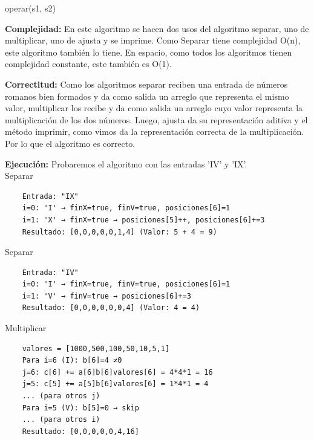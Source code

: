 \documentclass[12pt]{article}
\begin{document}
\begin{itemize}
\begin{enumerate}
        \end{enumerate}
            \begin{algorithm}[H]
        \caption{operar(s1, s2)}
        \SetAlgoLined
        \end{algorithm}
        \textbf{Complejidad:} En este algoritmo se hacen dos usos del algoritmo separar, uno de multiplicar, uno de ajusta y se imprime. Como Separar tiene complejidad O(n), este algoritmo también lo tiene.
        En espacio, como todos los algoritmos tienen complejidad constante, este también es O(1).

        \textbf{Correctitud:} Como los algoritmos separar reciben una entrada de números romanos bien formados y da como salida un arreglo que representa el mismo valor, multiplicar los recibe y da como salida un arreglo cuyo valor representa la multiplicación de los dos números. Luego, ajusta da su representación aditiva y el método imprimir, como vimos da la representación correcta de la multiplicación. Por lo que el algoritmo es correcto.

        \textbf{Ejecución:} Probaremos el algoritmo con las entradas 'IV' y 'IX'.\\
    Separar\\
    \begin{verbatim}
    Entrada: "IX"
    i=0: 'I' → finX=true, finV=true, posiciones[6]=1
    i=1: 'X' → finX=true → posiciones[5]++, posiciones[6]+=3
    Resultado: [0,0,0,0,0,1,4] (Valor: 5 + 4 = 9)
    \end{verbatim}

    Separar\\
    \begin{verbatim}
    Entrada: "IV"
    i=0: 'I' → finX=true, finV=true, posiciones[6]=1
    i=1: 'V' → finV=true → posiciones[6]+=3
    Resultado: [0,0,0,0,0,0,4] (Valor: 4 = 4)
    \end{verbatim}

    Multiplicar\\
    \begin{verbatim}
    valores = [1000,500,100,50,10,5,1]
    Para i=6 (I): b[6]=4 ≠0
    j=6: c[6] += a[6]b[6]valores[6] = 4*4*1 = 16
    j=5: c[5] += a[5]b[6]valores[6] = 1*4*1 = 4
    ... (para otros j)
    Para i=5 (V): b[5]=0 → skip
    ... (para otros i)
    Resultado: [0,0,0,0,0,4,16]
    \end{verbatim}


\end{itemize}
\end{document}
